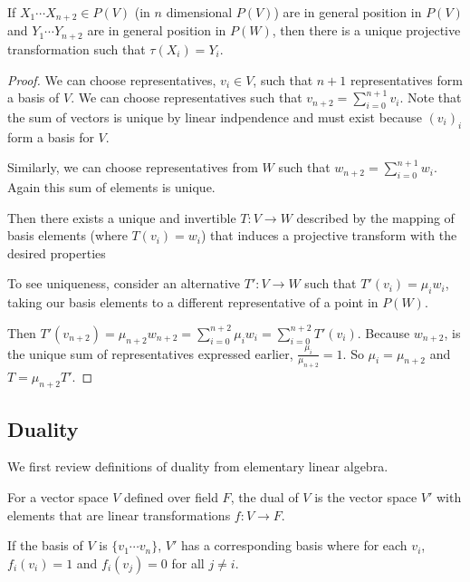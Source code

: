\documentclass[10pt]{article}
\begin{document}
\begin{theorem}
	 If $X_1 \cdots X_{n+2} \in P(V)$ (in $n$ dimensional $P(V)$) are in general
	 position in $P(V)$ and $Y_1 \cdots Y_{n+2}$ are in general position in
	 $P(W)$, then there is a unique projective transformation such that
	 $\tau(X_i) = Y_i$.
\end{theorem}

\begin{proof}

	We can choose representatives, $v_i \in V$, such that $n+1$ representatives
	form a basis of $V$. We can choose representatives such that
	$v_{n+2} = \sum_{i=0}^{n+1} v_i$. Note that the sum of vectors is unique by
	linear indpendence and must exist because $( v_i )_i$ form a basis for $V$.

	Similarly, we can choose representatives from $W$ such that $w_{n+2} =
	\sum_{i=0}^{n+1} w_i$. Again this sum of elements is unique.

	Then there exists a unique and invertible $T: V \to W$ described by the mapping of basis
	elements (where $T(v_i) = w_i$) that induces a projective transform with the
	desired properties

	To see uniqueness, consider an alternative $T': V \to W$ such that $T'(v_i) =
	\mu_i w_i$, taking our basis elements to a different representative of a point in $P(W)$.

	Then $T'(v_{n+2}) = \mu_{n+2} w_{n+2} = \sum_{i=0}^{n+2} \mu_i w_i =
	\sum_{i=0}^{n+2} T'(v_i)$. Because $w_{n+2}$, is the unique sum of
	representatives expressed earlier, $\frac{\mu_i}{\mu_{n+2}} = 1$. So $\mu_i =
	\mu_{n+2}$ and $T = \mu_{n+2}T'$.

\end{proof}

\subsection{Duality}

We first review definitions of duality from elementary linear algebra.

\begin{definition}
For a vector space $V$ defined over field $F$, the dual of $V$ is the vector
space $V'$ with elements that are linear transformations $f: V \to F$.
\end{definition}

\begin{definition}
If the basis of $V$ is $\{ v_1 \cdots v_n \}$, $V'$ has a corresponding basis
where for each $v_i$, $f_i(v_i) = 1$ and $f_i(v_j) = 0$ for all $j \neq i$.
\end{definition}
\end{document}
